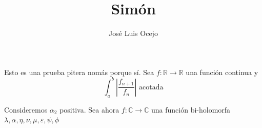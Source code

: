 \documentclass[12pt,a4paper]{article}
\title{Simón}
\author{José Luis Ocejo}
\date{}
\numberwithin{equation}{section}
\begin{document}
Esto es una prueba pitera nomás porque sí. Sea \( f: \mathbb{R}\to \mathbb{R} \) una función continua y \[
    \int_{a}^{b} \left| \dfrac{f_{n+1}}{f_{n}} \right| \text{ acotada}
\]	

Consideremos \( \alpha_{2} \) positiva. Sea ahora \( f: \mathbb{C} \to \mathbb{C} \) una función bi-holomorfa \( \lambda, \alpha, \eta, \nu, \mu, \varepsilon, \psi, \phi \) 
\end{document}
